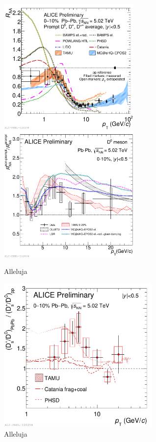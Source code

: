 \documentclass[3p,times,procedia]{elsarticle}
\begin{document}

\section{}
\label{}

\begin{figure}[h]
\includegraphics[width=7cm]{Plots/D/2019-10-31-2019-10-28-DmesonAverage_vs_transportmodels_010_5dot02.pdf}
\includegraphics[width=7cm]{Plots/NP/2019-10-31-2019-10-29-D0PbPb5TeV_010_RaaRatio_wModel.pdf}
\caption{Alleluja}
\label{fig:prompt_nonpromptRAA}
\end{figure}

\begin{figure}[h]
\includegraphics[width=8cm]{Plots/D/2019-10-31-2019-10-28-DoubleRatio_DsOverDzero_PbPb2018_010_pp_WithModels.pdf}
\caption{Alleluja}
\label{fig:DsD0}
\end{figure}
\end{document}
